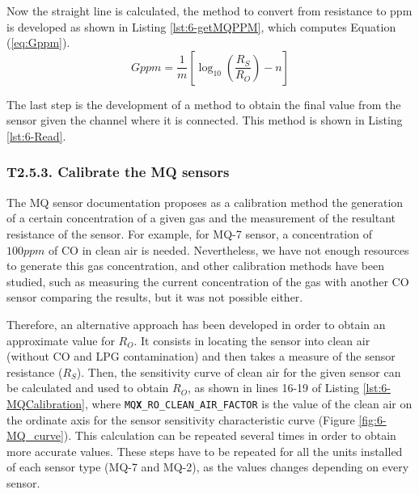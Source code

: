 Now the straight line is calculated, the method to convert from resistance to ppm is developed as shown in Listing \ref{lst:6-getMQPPM}, which computes Equation (\ref{eq:Gppm}). 
\begin{equation} \label{eq:Gppm}
Gppm=\frac {1}{m} \left[ \log_{10}{ \left( \frac{{R}_{S}}{{R}_{O}} \right)}-n \right] 
\end{equation}



The last step is the development of a method to obtain the final value from the sensor given the channel where it is connected. This method is shown in Listing \ref{lst:6-Read}.




\subsubsection{T2.5.3. Calibrate the MQ sensors}
The MQ sensor documentation proposes as a calibration method the generation of a certain concentration of a given gas and the measurement of the resultant resistance of the sensor. For example, for MQ-7 sensor, a concentration of $100ppm$ of CO in clean air is needed. Nevertheless, we have not enough resources to generate this gas concentration, and other calibration methods have been studied, such as measuring the current concentration of the gas with another CO sensor comparing the results, but it was not possible either. 

Therefore, an alternative approach has been developed in order to obtain an approximate value for ${R}_{O}$. It consists in locating the sensor into clean air (without CO and LPG contamination) and then takes a measure of the sensor resistance (${R}_{S}$). Then, the sensitivity curve of clean air for the given sensor can be calculated and used to obtain ${R}_{O}$, as shown in lines 16-19 of Listing \ref{lst:6-MQCalibration}, where \texttt{MQ\textbf{X}\_RO\_CLEAN\_AIR\_FACTOR} is the value of the clean air on the ordinate axis for the sensor sensitivity characteristic curve (Figure \ref{fig:6-MQ_curve}). This calculation can be repeated several times in order to obtain more accurate values. These steps have to be repeated for all the units installed of each sensor type (MQ-7 and MQ-2), as the values changes depending on every sensor.

